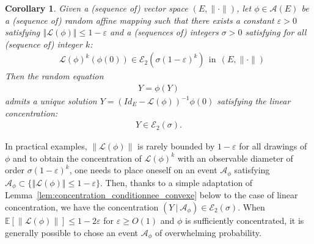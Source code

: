 \documentclass{ws-rmta}
\newcounter{ccorollary}
\newtheorem{corollaire}[ccorollary]{Corollary}
\begin{document}
\begin{corollaire}\label{cor:Concentration_linearire_solution_implicite_hypo_concentration_phi^k_pour tout_k}
  Given a (sequence of) vector space $(E, \| \cdot \|)$, let $\phi\in \mathcal A(E)$ be a (sequence of) random affine mapping such that there exists a constant $\varepsilon>0$  satisfying $\left\Vert\mathcal L(\phi)\right\Vert \leq 1-\varepsilon$ and a (sequences of) integers $\sigma >0$ satisfying for all (sequence of) integer $k$:
  \begin{align*}%
    & \mathcal L(\phi)^k(\phi(0)) \in \mathcal E_2 \left(\sigma(1-\varepsilon)^k\right)  \ \ \text{in} \  \ (E, \| \cdot \|)
  \end{align*}
  Then the random equation
  \begin{align*}
    Y = \phi(Y)
  \end{align*}
  admits a unique solution $Y = ( Id_E - \mathcal L(\phi))^{-1} \phi(0)$ satisfying the linear concentration:
  \begin{align*}
    Y\in \mathcal E_2(\sigma)  .
  \end{align*}
\end{corollaire}
In practical examples, $\|\mathcal L(\phi)\|$ is rarely bounded by $1-\varepsilon$ for all drawings of $\phi$ and to obtain the concentration of $\mathcal L(\phi)^k$ with an observable diameter of order $\sigma(1- \varepsilon)^k$, one needs to place oneself on an event $\mathcal A_\phi$ satisfying $\mathcal A_\phi \subset \{\left\Vert\mathcal L(\phi)\right\Vert \leq 1-\varepsilon\}$. Then, thanks to a simple adaptation of Lemma~\ref{lem:concentration_conditionnee_convexe} below to the case of linear concentration, we have the concentration $(Y \ | \ \mathcal A_\phi)\in \mathcal E_2(\sigma)$. When $\mathbb E[\|\mathcal L(\phi)\|] \leq 1-2 \varepsilon$ for $\varepsilon\geq O(1)$ and $\phi$ is sufficiently concentrated, it is generally possible to chose an event $\mathcal A_\phi$ of overwhelming probability. %
\end{document}
